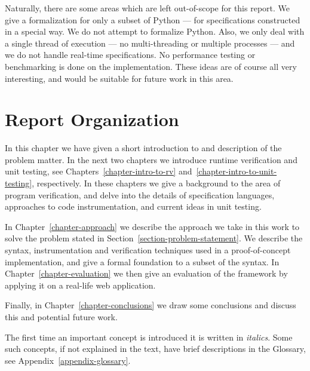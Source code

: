 Naturally, there are some areas which are left out-of-scope for this report. We
give a formalization for only a subset of Python --- for specifications
constructed in a special way. We do not attempt to formalize Python. Also, we
only deal with a single thread of execution --- no multi-threading or multiple
processes --- and we do not handle real-time specifications. No performance
testing or benchmarking is done on the implementation. These ideas are of
course all very interesting, and would be suitable for future work in this
area.


\section{Report Organization}

In this chapter we have given a short introduction to and description of the
problem matter. In the next two chapters we introduce runtime verification and
unit testing, see Chapters~\ref{chapter-intro-to-rv}
and~\ref{chapter-intro-to-unit-testing}, respectively. In these chapters we
give a background to the area of program verification, and delve into the
details of specification languages, approaches to code instrumentation, and
current ideas in unit testing.

In Chapter~\ref{chapter-approach} we describe the approach we take in this work to
solve the problem stated in Section~\ref{section-problem-statement}. We
describe the syntax, instrumentation and verification techniques used in a
proof-of-concept implementation, and give a formal foundation to a subset of
the syntax. In Chapter~\ref{chapter-evaluation} we then give an evaluation of
the framework by applying it on a real-life web application.

Finally, in Chapter~\ref{chapter-conclusions} we draw some conclusions and
discuss this and potential future work.

The first time an important concept is introduced it is written in
\textit{italics}. Some such concepts, if not explained in the text, have
brief descriptions in the Glossary, see Appendix~\ref{appendix-glossary}.
